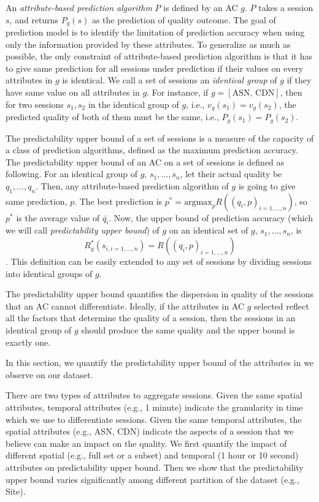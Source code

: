 An {\it attribute-based prediction algorithm} $P$ is defined by an AC $g$. $P$ takes a session $s$, and returns $P_g(s)$ as the prediction of quality outcome. 
The goal of prediction model is to identify the limitation of prediction accuracy when using only the information provided by these attributes. To generalize as much as possible, the only constraint of attribute-based prediction algorithm is that it has to give same prediction for all sessions under prediction if their values on every attributes in $g$ is identical. We call a set of sessions an {\it identical group} of $g$ if they have same value on all attributes in $g$. For instance, if $g=[\textrm{ASN, CDN}]$, then for two sessions $s_1,s_2$ in the identical group of $g$, i.e., $v_g(s_1)=v_g(s_2)$, the predicted quality of both of them must be the same, i.e., $P_g(s_1)=P_g(s_2)$. 


The predictability upper bound of a set of sessions is a measure of the capacity of a class of prediction algorithms, defined as the maximum prediction accuracy. The predictability upper bound of an AC on a set of sessions is defined as following. 
For an identical group of $g$, $s_1,\dots,s_n$, let their actual quality be $q_1,\dots,q_n$. Then, any attribute-based prediction algorithm of $g$ is going to give same prediction, $p$. The best prediction is $p^*=\textrm{argmax}_p R((q_i,p)_{i=1,\dots,n})$, so $p^*$ is the average value of $\bar{q_i}$. Now, the upper bound of prediction accuracy (which we will call {\it predictability upper bound}) of $g$ on an identical set of $g$, $s_1,\dots,s_n$, is $$R^*_g(s_{i,i=1,\dots,n})=R((q_i,p)_{i=1,\dots,n})$$. This definition can be easily extended to any set of sessions by dividing sessions into identical groups of $g$. 

The predictability upper bound quantifies the dispersion in quality of the sessions that an AC cannot differentiate. Ideally, if the attributes in AC $g$ selected reflect all the factors that determine the quality of a session, then the sessions in an identical group of $g$ should produce the same quality and the upper bound is exactly one. 


In this section, we quantify the predictability upper bound of the attributes in we observe on our dataset. 


There are two types of attributes to aggregate sessions. Given the same spatial attributes, temporal attributes (e.g., 1 minute) indicate the granularity in time which we use to differentiate sessions. Given the same temporal attributes, the spatial attributes (e.g., ASN, CDN) indicate the aspects of a session that we believe can make an impact on the quality.
We first quantify the impact of different spatial (e.g., full set or a subset) and temporal (1 hour or 10 second) attributes on predictability upper bound. Then we show that the predictability upper bound varies significantly among different partition of the dataset (e.g., Site).

